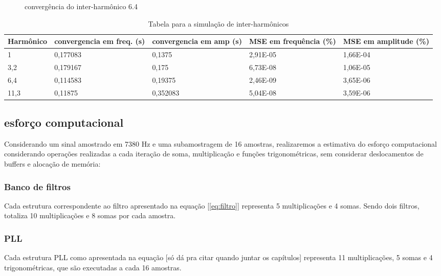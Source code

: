 \documentclass[a4paper, 12pt]{book}
\begin{document}
\begin{figure}[H]
	\centering    
	\def\svgscale{1}
	
	\caption{convergência do inter-harmônico 6.4}
	\label{fig:esquema_pll}
\end{figure}

\begin{table}[H]
	\centering
	\begin{tabular}{|p{2.5cm}|p{2.5cm}|p{2.5cm}|p{2.5cm}|p{2.5cm}|}
		\hline
		Harmônico & convergencia em freq. (s)& convergencia em amp (s) & MSE em frequência (\%) & MSE em amplitude (\%)\\
		\hline
		1    & 0,177083 & 0,1375   & 2,91E-05 & 1,66E-04 \\
		3,2  & 0,179167 & 0,175    & 6,73E-08 & 1,06E-05 \\
		6,4  & 0,114583 & 0,19375  & 2,46E-09 & 3,65E-06 \\
		11,3 & 0,11875  & 0,352083 & 5,04E-08 & 3,59E-06 \\
		\hline
	\end{tabular}
	\caption{Tabela para a simulação de inter-harmônicos}
\end{table}


\subsection{esforço computacional}

\indent Considerando um sinal amostrado em 7380  Hz e uma subamostragem de 16 amostras, realizaremos a estimativa do esforço computacional considerando operações realizadas a cada iteração de soma, multiplicação e funções trigonométricas, sem considerar deslocamentos de buffers e alocação de memória:

\subsubsection{Banco de filtros}

\indent Cada estrutura correspondente ao filtro apresentado na equação [\ref{eq:filtro}] representa 5 multiplicações e 4 somas. Sendo dois filtros, totaliza 10 multiplicações e 8 somas por cada amostra.

\subsubsection{PLL}

\indent Cada estrutura PLL como apresentada na equação [só dá pra citar quando juntar os capítulos] representa 11 multiplicações, 5 somas e 4 trigonométricas, que são executadas a cada 16 amostras. 
\end{document}
